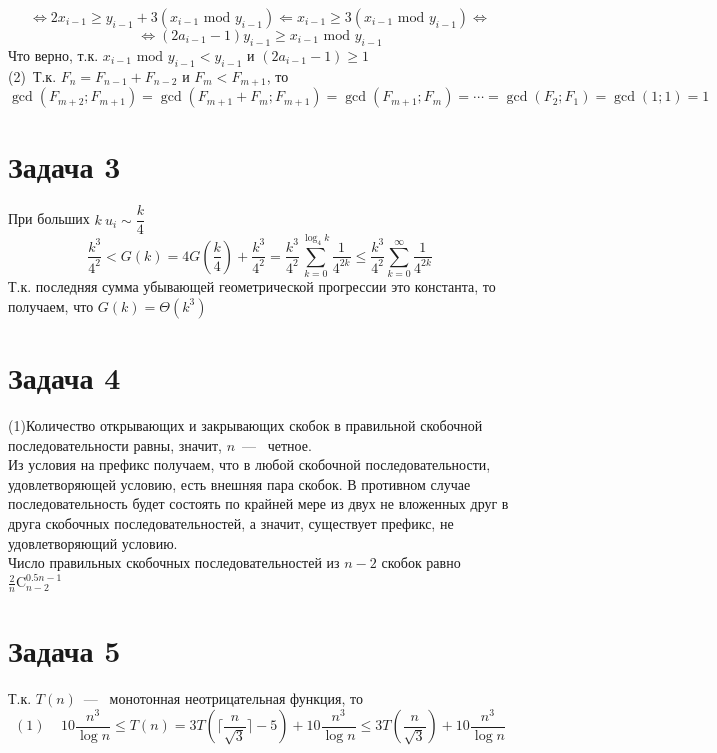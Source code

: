 \documentclass[a4paper,12pt]{article} %
\begin{document}
\[\Leftrightarrow 2x_{i-1}\geq y_{i-1} + 3(x_{i-1}\text{~mod~}y_{i-1})  
\Leftarrow x_{i-1} \geq 3(x_{i-1}\text{~mod~}y_{i-1})\Leftrightarrow\]
\[
	\Leftrightarrow (2a_{i-1}-1)y_{i-1} \geq x_{i-1}\text{~mod~}y_{i-1}
\]
Что верно, т.к. 
$ x_{i-1}\text{~mod~}y_{i-1} < y_{i-1} \text{~и~} (2a_{i-1}-1)\geq 1$\\

(2)~Т.к. $
F_n = F_{n-1}+F_{n-2}
$ и $F_m < F_{m+1}$, то\\
$\gcd(F_{m+2};F_{m+1}) = \gcd(F_{m+1}+F_{m};F_{m+1}) = \gcd(F_{m+1};F_{m}) = \cdots = \gcd(F_2;F_1) = \gcd(1;1) = 1 $

\section*{Задача 3}

При больших $k~u_i \sim \dfrac{k}{4}$\\
\[
\dfrac{k^3}{4^2} < G(k) = 4G\left(\dfrac{k}{4}\right) + \dfrac{k^3}{4^2} = \dfrac{k^3}{4^2}\sum_{k=0}^{\log_{4}{k}}{\dfrac{1}{4^{2k}}}\leq \dfrac{k^3}{4^2} \sum_{k=0}^{\infty}{\dfrac{1}{4^{2k}}}
\] 
Т.к. последняя сумма убывающей геометрической прогрессии это константа, то получаем, что $G(k)=\Theta(k^3)$

\section*{Задача 4}

(1)Количество открывающих и закрывающих скобок в правильной скобочной последовательности равны, значит, $n$~---~ четное.\\

Из условия на префикс получаем, что в любой скобочной последовательности, удовлетворяющей условию, есть внешняя пара скобок. В противном случае последовательность будет состоять по крайней мере из двух не вложенных друг в друга скобочных последовательностей, а значит, существует префикс, не удовлетворяющий условию.\\

Число правильных скобочных последовательностей из $n-2$  скобок равно 
$
\frac{2}{n}\text{C}_{n-2}^{0.5n-1}
$  \\


\section*{Задача 5}
Т.к. $T(n)$~---~ монотонная неотрицательная функция, то 
\[
	(1)~~~~~10\dfrac{n^3}{\log{n}} \leq T(n)=3T\left(\lceil\frac{n}{\sqrt{3}}\rceil-5\right)+10\dfrac{n^3}{\log{n}} \leq 3T\left(\dfrac{n}{\sqrt{3}}\right)+10\dfrac{n^3}{\log{n}}
\]
\end{document}
